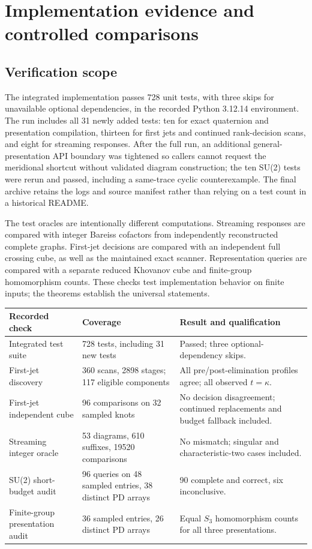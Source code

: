 \section{Implementation evidence and controlled comparisons}
\label{sec:experiments}

\subsection{Verification scope}

The integrated implementation passes 728 unit tests, with three skips for
unavailable optional dependencies, in the recorded Python 3.12.14
environment. The run includes all 31 newly added tests: ten for exact
quaternion and presentation compilation, thirteen for first jets and
continued rank-decision scans, and eight for streaming responses.
After the full run, an additional general-presentation API boundary was
tightened so callers cannot request the meridional shortcut without
validated diagram construction; the ten SU(2) tests were rerun and passed,
including a same-trace cyclic counterexample. The final archive retains
the logs and source manifest rather than relying on a test count in a
historical README.

The test oracles are intentionally different computations. Streaming
responses are compared with integer Bareiss cofactors from independently
reconstructed complete graphs. First-jet decisions are compared with
an independent full crossing cube, as well as the maintained exact scanner.
Representation queries are compared with a separate reduced Khovanov cube
and finite-group homomorphism counts. These checks test implementation
behavior on finite inputs; the theorems establish the universal statements.

\begin{center}\small
\begin{tabularx}{\textwidth}{@{}p{}YY@{}}
\toprule
Recorded check & Coverage & Result and qualification\\
\midrule
Integrated test suite & 728 tests, including 31 new tests & Passed; three optional-dependency skips.\\
First-jet discovery & 360 scans, 2898 stages; 117 eligible components & All pre/post-elimination profiles agree; all observed $t=\kappa$.\\
First-jet independent cube & 96 comparisons on 32 sampled knots & No decision disagreement; continued replacements and budget fallback included.\\
Streaming integer oracle & 53 diagrams, 610 suffixes, 19520 comparisons & No mismatch; singular and characteristic-two cases included.\\
SU(2) short-budget audit & 96 queries on 48 sampled entries, 38 distinct PD arrays & 90 complete and correct, six inconclusive.\\
Finite-group presentation audit & 36 sampled entries, 26 distinct PD arrays & Equal $S_3$ homomorphism counts for all three presentations.\\
\bottomrule
\end{tabularx}\end{center}

